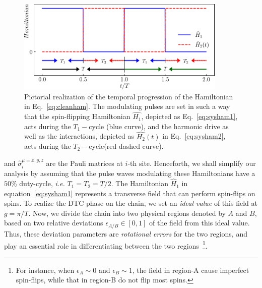 \documentclass[12pt]{iopart}
\begin{document}
\begin{figure}
    \begin{center}
        \includegraphics[width=10cm]{figure1.pdf}
    \end{center}
    \caption{Pictorial realization of the temporal progression of the Hamiltonian in Eq.~\eqref{eq:cleanham}. The modulating pulses are set in such a way that the spin-flipping Hamiltonian $\hat{H_1}$, depicted as Eq.~\eqref{eq:sysham1}, acts during the $T_1-$cycle (blue curve), and the harmonic drive as well as the interactions, depicted as $\hat{H_2}(t)$ in Eq.~\eqref{eq:sysham2}, acts during the $T_2-$cycle(red dashed curve).}
    \label{Fig:time_distribution}
\end{figure}	
and $\hat{\sigma}^{\mu=x,y,z}_i$ are the Pauli matrices at $i$-th site.  Henceforth, we shall simplify our analysis by assuming that the pulse waves modulating these Hamiltonians have a $50 \%$ duty-cycle, \textit{i.e.} $T_1=T_2=T/2$.  The Hamiltonian $\hat{H}_1$ in equation~\eqref{eq:sysham1} represents a transverse field that can perform spin-flips on spins. To realize the DTC phase on the chain, we set an \textit{ideal value} of this field at $g=\pi/T$. Now, we divide the chain into two physical regions denoted by $A$ and $B$, based on two relative deviations $\epsilon_{A/B}\in[0,1]$ of the field from this ideal value. Thus, these deviation parameters are \textit{rotational errors} for the two regions, and play an essential role in differentiating between the two regions~\footnote{For instance, when $\epsilon_A \sim 0$ and $\epsilon_B \sim 1$, the field in region-A cause imperfect spin-flips, while that in region-B do not flip most spins.}.
\end{document}
